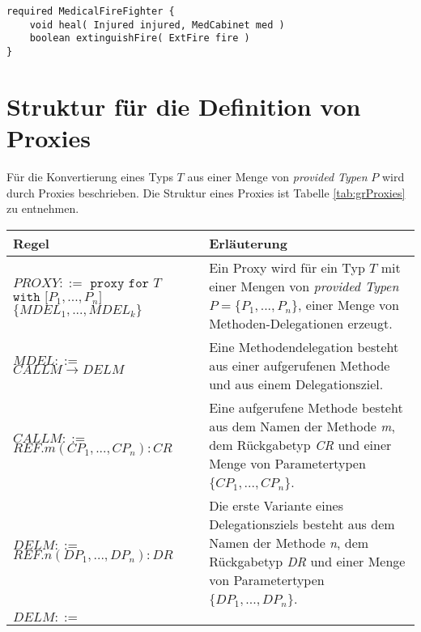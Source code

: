 \documentclass[a4paper,12pt]{article}
\begin{document}
\begin{lstlisting}[caption={Bibliothek \emph{ExampLe} von Typen},captionpos=b, style = dsl]
required MedicalFireFighter {
	void heal( Injured injured, MedCabinet med )
	boolean extinguishFire( ExtFire fire )	
}
\end{lstlisting}\label{lst:libEx}

\newpage

\section{Struktur für die Definition von Proxies}\label{sec:proxygram}
Für die Konvertierung eines Typs $T$ aus einer Menge von \emph{provided Typen} $P$ wird durch Proxies beschrieben. Die Struktur eines Proxies ist Tabelle \ref{tab:grProxies} zu entnehmen.
\begin{table}[H]
\centering
\begin{tabular}{|p{5cm}|p{9cm}|}
\hline
\hline
\centering\textbf{Regel} & \textbf{Erläuterung} \\
\hline
\hline
$\mathit{PROXY} ::=$\newline
$\texttt{proxy } \texttt{for } T$\newline
$ \texttt{with [}\mathit{P_1},...,\mathit{P_n}\texttt{]}$ \newline
$\texttt{\{}\mathit{MDEL_1},...,\mathit{MDEL_k} \texttt{\}}$
 & Ein Proxy wird für ein Typ $T$ mit einer Mengen von \emph{provided Typen} $P = \{P_1,...,P_n\}$, einer Menge von Methoden-Delegationen erzeugt.\\
\hline
$\mathit{MDEL} ::=$\newline
$CALLM \rightarrow DELM $  & Eine Methodendelegation besteht aus einer aufgerufenen Methode und aus einem Delegationsziel.\\
\hline
$\mathit{CALLM} ::=$\newline 
$\mathit{REF}.\mathit{m(\mathit{CP_1},...,\mathit{CP_n}):CR} $  & Eine aufgerufene Methode besteht aus dem Namen der Methode \emph{m}, dem Rückgabetyp \emph{CR} und einer Menge von Parametertypen $\{\mathit{CP_1},...,\mathit{CP_n}\}$.\\
\hline
$\mathit{DELM} ::=$\newline 
$\mathit{REF}.\mathit{n(\mathit{DP_1},...,\mathit{DP_n}):DR} $  
& Die erste Variante eines Delegationsziels besteht aus  dem Namen der Methode \emph{n}, dem Rückgabetyp \emph{DR} und einer Menge von Parametertypen $\{\mathit{DP_1},...,\mathit{DP_n}\}$.\\
\hline
$\mathit{DELM} ::=$\newline

\end{tabular}
\end{table}
\end{document}

